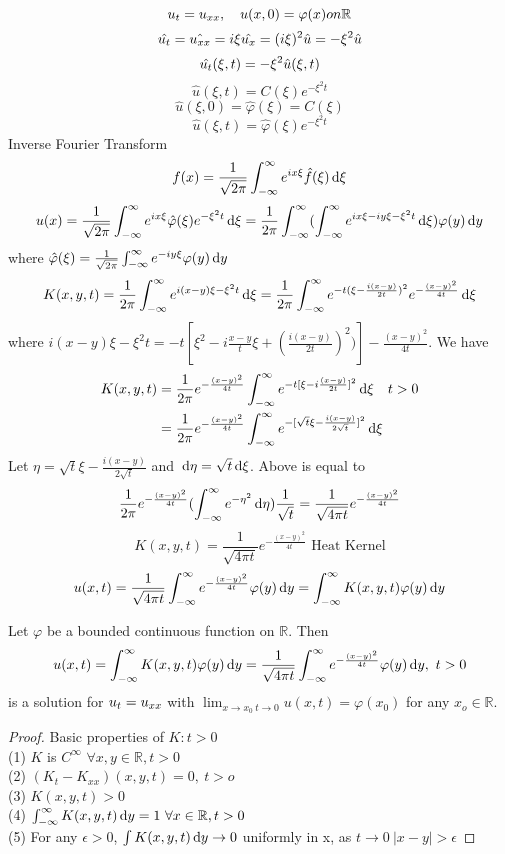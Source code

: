 \[u_{t}=u_{xx},\quad u(x,0)=\varphi(x) on \mathbb{R}
\]
\[\hat{u_{t}}=\hat{u_{xx}}=i\xi\hat{u_x}=(i\xi)^2\hat{u}=-\xi^2\hat{u}
\]
\[\hat{u_{t}}(\xi,t)=-\xi^2\hat{u}(\xi,t)
\]
\[\hat{u}(\xi,t)=C(\xi)e^{-\xi^2t}
\]
\[\hat{u}(\xi,0)=\hat{\varphi}(\xi)=C(\xi)
\]
\[\hat{u}(\xi,t)=\hat{\varphi}(\xi)e^{-\xi^2t}
\]
Inverse Fourier Transform
\[f(x)=\frac{1}{\sqrt{2\pi}}\int_{-\infty}^\infty e^{ix\xi}\hat{f}(\xi)\,\mathrm{d} \xi
\]
\[u(x)=\frac{1}{\sqrt{2\pi}}\int_{-\infty}^\infty e^{ix\xi}\hat{\varphi}(\xi)e^{-\xi^2 t}\,\mathrm{d} \xi=\frac{1}{2\pi}\int_{-\infty}^\infty(\int_{-\infty}^\infty e^{ix\xi-iy\xi-\xi^2t}\,\mathrm{d} \xi)\varphi(y)\,\mathrm{d} y
\]
where $\hat{\varphi}(\xi)=\frac{1}{\sqrt{2\pi}}\int_{-\infty}^\infty e^{-iy\xi}\varphi(y)\,\mathrm{d} y$
\[K(x,y,t)=\frac{1}{2\pi}\int_{-\infty}^\infty e^{i(x-y)\xi-\xi^2t}\,\mathrm{d} \xi=\frac{1}{2\pi}\int_{-\infty}^\infty e^{-t(\xi-\frac{i(x-y)}{2t})^2}e^{-\frac{(x-y)^2}{4t}}\,\mathrm{d} \xi
\]
where $i(x-y)\xi-\xi^2t=-t[\xi^2-i\frac{x-y}{t}\xi+(\frac{i(x-y)}{2t})^2)]-\frac{(x-y)^2}{4t}$. We have
\[\begin{aligned}K(x,y,t)&=\frac{1}{2\pi}e^{-\frac{(x-y)^2}{4t}}\int_{-\infty}^\infty e^{-t[\xi-i\frac{(x-y)}{2t}]^2}\,\mathrm{d} \xi\quad t>0\\
&=\frac{1}{2\pi}e^{-\frac{(x-y)^2}{4t}}\int_{-\infty}^\infty e^{-[\sqrt{t}\xi-\frac{i(x-y)}{2\sqrt{t}}]^2}\,\mathrm{d} \xi
\end{aligned}
\]
Let $\eta=\sqrt{t}\xi-\frac{i(x-y)}{2\sqrt{t}}$ and $\,\mathrm{d} \eta=\sqrt{t}\,\mathrm{d} \xi$. Above is equal to \[\frac{1}{2\pi}e^{-\frac{(x-y)^2}{4t}}(\int_{-\infty}^\infty e^{-\eta^2}\,\mathrm{d} \eta)\frac{1}{\sqrt{t}}=\frac{1}{\sqrt{4\pi t}}e^{-\frac{(x-y)^2}{4t}} 
\]
\[K(x,y,t)=\frac{1}{\sqrt{4\pi t}}e^{-\frac{(x-y)^2}{4t}} \text{  Heat Kernel}
\]
\[u(x,t)=\frac{1}{\sqrt{4\pi t}}\int_{-\infty}^\infty e^{-\frac{(x-y)^2}{4t}}\varphi(y)\,\mathrm{d} y=\int_{-\infty}^\infty K(x,y,t)\varphi(y)\,\mathrm{d} y
\]
\begin{theorem}
Let $\varphi$ be a bounded continuous function on $\mathbb{R}$. Then 
\[u(x,t)=\int_{-\infty}^\infty K(x,y,t)\varphi(y)\,\mathrm{d} y=\frac{1}{\sqrt{4\pi t}}\int_{-\infty}^\infty e^{-\frac{(x-y)^2}{4t}}\varphi(y)\,\mathrm{d} y, ~t>0\] 
is a solution for $u_{t}=u_{xx}$ with $\lim_{x\rightarrow x_0~ t\rightarrow0}u(x,t)=\varphi(x_0)$ for any $x_o\in\mathbb{R}$. 

\end{theorem}
\begin{proof}
Basic properties of $K:t>0$\\
(1) $K$ is $C^\infty$ $\forall x,y \in \mathbb{R}, t>0$\\
(2) $(K_t-K_{xx})(x,y,t)=0, ~t>o$\\
(3) $K(x,y,t)>0$\\
(4) $\int_{-\infty}^\infty K(x,y,t)\,\mathrm{d} y=1~\forall x\in\mathbb{R}, t>0$\\
(5) For any $\epsilon>0$, $\int K(x,y,t)\,\mathrm{d} y\rightarrow0$ uniformly in x, as $t\rightarrow0~|x-y|>\epsilon$ 
\end{proof}
